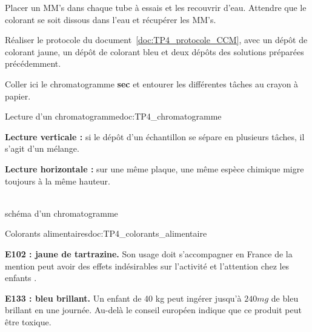 \mesure
Placer un MM's dans chaque tube à essais et les recouvrir d'eau.
Attendre que le colorant se soit dissous dans l'eau et récupérer les MM's.

\mesure
Réaliser le protocole du document~\ref{doc:TP4_protocole_CCM}, avec un dépôt de colorant jaune, un dépôt de colorant bleu et deux dépôts des solutions préparées précédemment.

\mesure
Coller ici le chromatogramme \textbf{sec} et entourer les différentes tâches au crayon à papier.
\vspace*{240pt}




\begin{doc}{Lecture d'un chromatogramme}{doc:TP4_chromatogramme}
  \begin{multicols}{2}
    \begin{listePoints}
      \item \textbf{Lecture verticale :} si le dépôt d'un échantillon se sépare en plusieurs tâches, il s'agit d'un mélange.
      \item \textbf{Lecture horizontale :} sur une même plaque, une même espèce chimique migre toujours à la même hauteur.
    \end{listePoints}
    \vfill \strut

    \centering
     \\
    \footnotesize{schéma d'un chromatogramme}
  \end{multicols}
\end{doc}

\begin{doc}{Colorants alimentaires}{doc:TP4_colorants_alimentaire}
  \begin{listePoints}
    \item \textbf{E102 : jaune de tartrazine.} Son usage doit s'accompagner en France de la mention \og peut avoir des effets indésirables sur l'activité et l'attention chez les enfants \fg.
    \item \textbf{E133 : bleu brillant.} Un enfant de 40 kg peut ingérer jusqu'à $240\unit{mg}$ de bleu brillant en une journée. Au-delà le conseil européen indique que ce produit peut être toxique.
  \end{listePoints}
\end{doc}

